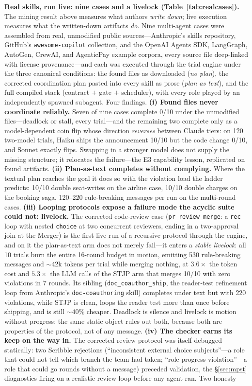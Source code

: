 \documentclass{article}
\newcommand{\stjp}{\textsc{STJP}}
\begin{document}
\textbf{Real skills, run live: nine cases and a livelock (Table~\ref{tab:realcases}).}\label{sec:real} The mining result above measures what authors \emph{write down}; live execution measures what the written-down artifacts \emph{do}. Nine multi-agent cases were assembled from real, unmodified public sources---Anthropic's skills repository, GitHub's \texttt{awesome-copilot} collection, and the OpenAI Agents SDK, LangGraph, AutoGen, CrewAI, and AgenticPay example corpora, every source file deep-linked with license provenance---and each was executed through the trial engine under the three canonical conditions: the found files as downloaded (\emph{no plan}), the corrected coordination plan pasted into every skill as prose (\emph{plan as text}), and the full compiled stack (contract $+$ gate $+$ scheduler), with every role played by an independently spawned subagent. Four findings. \textbf{(i) Found files never coordinate reliably.} Seven of nine cases complete 0/10 under the unmodified files---deadlock or stall, every trial---and the remaining two complete only as a model-dependent coin flip whose direction \emph{reverses} between Claude tiers: on 120 two-model trials, Haiku ships the announcement 10/10 but the code change 0/10, and Sonnet exactly flips. Swapping in a stronger model does not supply the missing structure; it relocates the failure---the E3 capability lesson, replicated on found artifacts. \textbf{(ii) Plan-as-text completes without complying.} Where the textual plan reaches the goal it does so with the violation load the ladder predicts: 10/10 double seat-writes on the airline case, 10/10 double charges on the booking saga, 120--220 rule-breaking messages per run on the multi-round cases. \textbf{(iii) Looping protocols expose a failure mode the acyclic suite could not: livelock.} The corrected code-review case (\texttt{pr\_review\_merge}: a \texttt{rec} loop with nested \texttt{choice} at two concurrent reviewers, ending in a two-approval join at the Merger) is the first live run of a recursive protocol through the engine, and on it the plan-as-text arm does not merely fail---it enters a \emph{stable livelock}: all 10 trials burn the entire 16-round budget in motion, emitting 530 rule-breaking messages and $\sim$42k tokens per trial while merging nothing, at $3.6\times$ the token cost and $5.3\times$ the LLM calls of the \stjp{} arm that merges 10/10 with zero violations in 7 rounds. Its sibling (\texttt{doc\_coauthor\_ship}, the reader-test refinement loop from Anthropic's \texttt{doc-coauthoring} skill) completes under text but with 220 violations, while \stjp{} is clean, loops the reader test more than once before shipping, and is still ${\sim}40\%$ cheaper. Deadlock is silence and livelock is motion without progress; the same static object rules out both, because both are properties of the protocol, not of any message. \textbf{(iv) The checker earns its keep on the way in.} The corrected review protocol was itself debugged statically: two Scribble rejections (``inconsistent external choice subjects''---a role that could not tell which branch the team had taken; ``role progress violation''---a role that could go rounds without a message) preceded validation, the \S\ref{sec:mpst} diagnostics firing on a realistic review loop before any agent ran. Two honesty 
\end{document}
